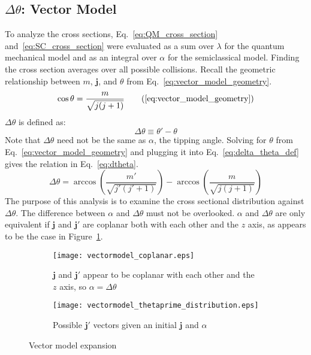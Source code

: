 \documentclass[letterpaper,11pt]{article}
\newcommand{\vectorize}[1]{\boldsymbol{#1}}
\begin{document}
\subsection{$\Delta \theta$: Vector Model}
To analyze the cross sections, Eq.~\ref{eq:QM_cross_section}
and~\ref{eq:SC_cross_section} were evaluated as a sum over $\lambda$ for the
quantum mechanical model and as an integral over $\alpha$ for the semiclassical
model.  Finding the cross section averages over all possible collisions.
Recall the geometric relationship between $m$, $\vectorize{j}$, and $\theta$
from Eq.~\ref{eq:vector_model_geometry}.
\begin{equation*}
    \cos\theta=\frac{m}{\sqrt{j(j+1)}}
    \tag{\ref{eq:vector_model_geometry}}
\end{equation*}
$\Delta \theta$ is defined as:
\begin{equation}
    \Delta\theta\equiv\theta'-\theta
    \label{eq:delta_theta_def}
\end{equation}
Note that $\Delta\theta$ need not be the same as $\alpha$, the tipping angle.
Solving for $\theta$ from Eq.~\ref{eq:vector_model_geometry} and plugging it
into Eq.~\ref{eq:delta_theta_def} gives the relation in Eq.~\ref{eq:dtheta}.
\begin{equation}
    \Delta\theta = \arccos\left(\frac{m'}{\sqrt{j'(j'+1)}}\right)-\arccos\left(\frac{m}{\sqrt{j(j+1)}}\right)
    \label{eq:dtheta}
\end{equation}
The purpose of this analysis is to examine the cross sectional distribution
against $\Delta\theta$.  The difference between $\alpha$ and $\Delta\theta$
must not be overlooked.  $\alpha$ and $\Delta \theta$ are only equivalent if
$\vectorize{j}$ and $\vectorize{j'}$ are coplanar both with each other and the $z$ axis, as appears to
be the case in Figure~\ref{fig:vectormodel_coplanar}.
\begin{figure}[ht]
    \centering
    \begin{subfigure}{0.49\textwidth}
        \texttt{[image: vectormodel\_coplanar.eps]}
        \caption{$\vectorize{j}$ and $\vectorize{j'}$ appear to be coplanar with each other and the $z$ axis, so $\alpha=\Delta\theta$}
\label{fig:vectormodel_coplanar}
    \end{subfigure}
    \hspace*{\fill}
    \begin{subfigure}{0.49\textwidth}
        \texttt{[image: vectormodel\_thetaprime\_distribution.eps]}
        \caption{Possible $\vectorize{j'}$ vectors given an initial $\vectorize{j}$ and $\alpha$}
\label{fig:vectormodel_tpdist}
    \end{subfigure}
    \caption{Vector model expansion}
\label{fig:vectormodelexpansion}
\end{figure}
\end{document}
